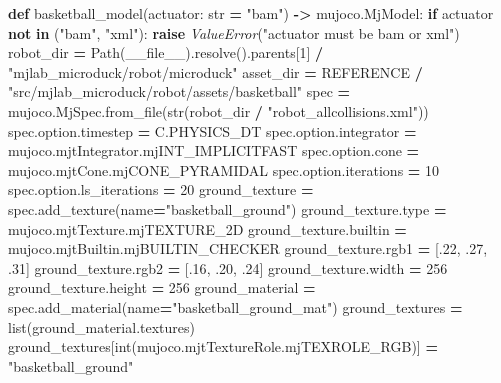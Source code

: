 \documentclass[
  american,
  11pt,
  letterpaper,
]{article}
\newenvironment{Shaded}{\begin{snugshade}}{\end{snugshade}}
\newcommand{\BuiltInTok}[1]{#1}
\newcommand{\ControlFlowTok}[1]{\textcolor[rgb]{0.13,0.29,0.53}{\textbf{#1}}}
\newcommand{\DecValTok}[1]{\textcolor[rgb]{0.00,0.00,0.81}{#1}}
\newcommand{\FloatTok}[1]{\textcolor[rgb]{0.00,0.00,0.81}{#1}}
\newcommand{\KeywordTok}[1]{\textcolor[rgb]{0.13,0.29,0.53}{\textbf{#1}}}
\newcommand{\NormalTok}[1]{#1}
\newcommand{\OperatorTok}[1]{\textcolor[rgb]{0.81,0.36,0.00}{\textbf{#1}}}
\newcommand{\PreprocessorTok}[1]{\textcolor[rgb]{0.56,0.35,0.01}{\textit{#1}}}
\newcommand{\StringTok}[1]{\textcolor[rgb]{0.31,0.60,0.02}{#1}}
\newcommand{\VariableTok}[1]{\textcolor[rgb]{0.00,0.00,0.00}{#1}}
\renewenvironment{Shaded}{\par\smallskip}{\par\smallskip}
\begin{document}
\begin{Shaded}
\begin{Highlighting}[]
\KeywordTok{def}\NormalTok{ basketball\_model(actuator: }\BuiltInTok{str} \OperatorTok{=} \StringTok{"bam"}\NormalTok{) }\OperatorTok{{-}\textgreater{}}\NormalTok{ mujoco.MjModel:}
    \ControlFlowTok{if}\NormalTok{ actuator }\KeywordTok{not} \KeywordTok{in}\NormalTok{ (}\StringTok{"bam"}\NormalTok{, }\StringTok{"xml"}\NormalTok{):}
        \ControlFlowTok{raise} \PreprocessorTok{ValueError}\NormalTok{(}\StringTok{"actuator must be bam or xml"}\NormalTok{)}
\NormalTok{    robot\_dir }\OperatorTok{=}\NormalTok{ Path(}\VariableTok{\_\_file\_\_}\NormalTok{).resolve().parents[}\DecValTok{1}\NormalTok{] }\OperatorTok{/} \StringTok{"mjlab\_microduck/robot/microduck"}
\NormalTok{    asset\_dir }\OperatorTok{=}\NormalTok{ REFERENCE }\OperatorTok{/} \StringTok{"src/mjlab\_microduck/robot/assets/basketball"}
\NormalTok{    spec }\OperatorTok{=}\NormalTok{ mujoco.MjSpec.from\_file(}\BuiltInTok{str}\NormalTok{(robot\_dir }\OperatorTok{/} \StringTok{"robot\_allcollisions.xml"}\NormalTok{))}
\NormalTok{    spec.option.timestep }\OperatorTok{=}\NormalTok{ C.PHYSICS\_DT}
\NormalTok{    spec.option.integrator }\OperatorTok{=}\NormalTok{ mujoco.mjtIntegrator.mjINT\_IMPLICITFAST}
\NormalTok{    spec.option.cone }\OperatorTok{=}\NormalTok{ mujoco.mjtCone.mjCONE\_PYRAMIDAL}
\NormalTok{    spec.option.iterations }\OperatorTok{=} \DecValTok{10}
\NormalTok{    spec.option.ls\_iterations }\OperatorTok{=} \DecValTok{20}
\NormalTok{    ground\_texture }\OperatorTok{=}\NormalTok{ spec.add\_texture(name}\OperatorTok{=}\StringTok{"basketball\_ground"}\NormalTok{)}
\NormalTok{    ground\_texture.}\BuiltInTok{type} \OperatorTok{=}\NormalTok{ mujoco.mjtTexture.mjTEXTURE\_2D}
\NormalTok{    ground\_texture.builtin }\OperatorTok{=}\NormalTok{ mujoco.mjtBuiltin.mjBUILTIN\_CHECKER}
\NormalTok{    ground\_texture.rgb1 }\OperatorTok{=}\NormalTok{ [}\FloatTok{.22}\NormalTok{, }\FloatTok{.27}\NormalTok{, }\FloatTok{.31}\NormalTok{]}
\NormalTok{    ground\_texture.rgb2 }\OperatorTok{=}\NormalTok{ [}\FloatTok{.16}\NormalTok{, }\FloatTok{.20}\NormalTok{, }\FloatTok{.24}\NormalTok{]}
\NormalTok{    ground\_texture.width }\OperatorTok{=} \DecValTok{256}
\NormalTok{    ground\_texture.height }\OperatorTok{=} \DecValTok{256}
\NormalTok{    ground\_material }\OperatorTok{=}\NormalTok{ spec.add\_material(name}\OperatorTok{=}\StringTok{"basketball\_ground\_mat"}\NormalTok{)}
\NormalTok{    ground\_textures }\OperatorTok{=} \BuiltInTok{list}\NormalTok{(ground\_material.textures)}
\NormalTok{    ground\_textures[}\BuiltInTok{int}\NormalTok{(mujoco.mjtTextureRole.mjTEXROLE\_RGB)] }\OperatorTok{=} \StringTok{"basketball\_ground"}

\end{Highlighting}
\end{Shaded}
\end{document}
